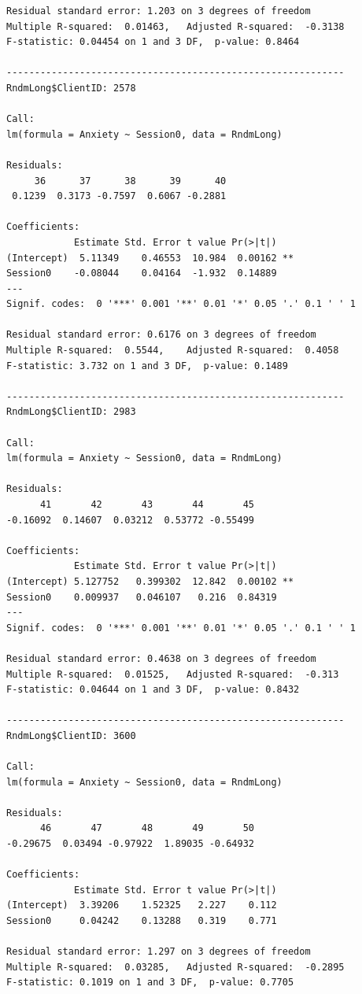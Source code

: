 \documentclass[
  11pt,
]{book}
\begin{document}
\begin{verbatim}
Residual standard error: 1.203 on 3 degrees of freedom
Multiple R-squared:  0.01463,   Adjusted R-squared:  -0.3138 
F-statistic: 0.04454 on 1 and 3 DF,  p-value: 0.8464

------------------------------------------------------------ 
RndmLong$ClientID: 2578

Call:
lm(formula = Anxiety ~ Session0, data = RndmLong)

Residuals:
     36      37      38      39      40 
 0.1239  0.3173 -0.7597  0.6067 -0.2881 

Coefficients:
            Estimate Std. Error t value Pr(>|t|)   
(Intercept)  5.11349    0.46553  10.984  0.00162 **
Session0    -0.08044    0.04164  -1.932  0.14889   
---
Signif. codes:  0 '***' 0.001 '**' 0.01 '*' 0.05 '.' 0.1 ' ' 1

Residual standard error: 0.6176 on 3 degrees of freedom
Multiple R-squared:  0.5544,    Adjusted R-squared:  0.4058 
F-statistic: 3.732 on 1 and 3 DF,  p-value: 0.1489

------------------------------------------------------------ 
RndmLong$ClientID: 2983

Call:
lm(formula = Anxiety ~ Session0, data = RndmLong)

Residuals:
      41       42       43       44       45 
-0.16092  0.14607  0.03212  0.53772 -0.55499 

Coefficients:
            Estimate Std. Error t value Pr(>|t|)   
(Intercept) 5.127752   0.399302  12.842  0.00102 **
Session0    0.009937   0.046107   0.216  0.84319   
---
Signif. codes:  0 '***' 0.001 '**' 0.01 '*' 0.05 '.' 0.1 ' ' 1

Residual standard error: 0.4638 on 3 degrees of freedom
Multiple R-squared:  0.01525,   Adjusted R-squared:  -0.313 
F-statistic: 0.04644 on 1 and 3 DF,  p-value: 0.8432

------------------------------------------------------------ 
RndmLong$ClientID: 3600

Call:
lm(formula = Anxiety ~ Session0, data = RndmLong)

Residuals:
      46       47       48       49       50 
-0.29675  0.03494 -0.97922  1.89035 -0.64932 

Coefficients:
            Estimate Std. Error t value Pr(>|t|)
(Intercept)  3.39206    1.52325   2.227    0.112
Session0     0.04242    0.13288   0.319    0.771

Residual standard error: 1.297 on 3 degrees of freedom
Multiple R-squared:  0.03285,   Adjusted R-squared:  -0.2895 
F-statistic: 0.1019 on 1 and 3 DF,  p-value: 0.7705


\end{verbatim}
\end{document}
